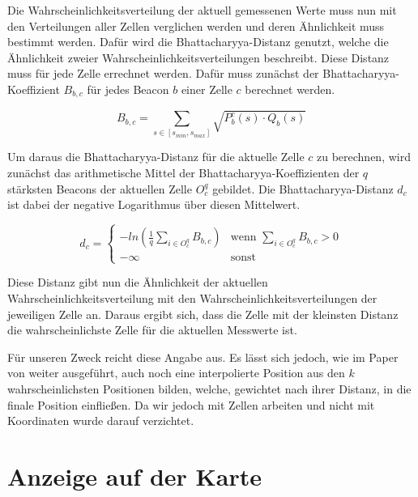 Die Wahrscheinlichkeitsverteilung der aktuell gemessenen Werte muss nun mit den Verteilungen aller Zellen verglichen werden und deren Ähnlichkeit muss bestimmt werden. Dafür wird die Bhattacharyya-Distanz genutzt, welche die Ähnlichkeit zweier Wahrscheinlichkeitsverteilungen beschreibt. 
Diese Distanz muss für jede Zelle errechnet werden. 
Dafür muss zunächst der Bhattacharyya-Koeffizient $B_{b, c}$ für jedes Beacon $b$ einer Zelle $c$ berechnet werden.

\begin{equation}
	B_{b, c} = \sum_{s \in [s_{min},s_{max}]} \sqrt{P_{b}^{c}(s) \cdot Q_{b}(s)}
\end{equation}

Um daraus die Bhattacharyya-Distanz für die aktuelle Zelle $c$ zu berechnen, wird zunächst das arithmetische Mittel der Bhattacharyya-Koeffizienten der $q$ stärksten Beacons der aktuellen Zelle $O_{c}^{q}$ gebildet. Die Bhattacharyya-Distanz $d_{c}$ ist dabei der negative Logarithmus über diesen Mittelwert.

\begin{equation}
	d_{c}= \begin{cases}
	-ln (\frac{1}{q} \sum_{i \in O_{c}^{q}} B_{b, c}) & \text{wenn } \sum_{i \in O_{c}^{q}} B_{b, c} > 0 \\
	- \infty & \text{sonst}
	\end{cases}
\end{equation}

Diese Distanz gibt nun die Ähnlichkeit der aktuellen Wahrscheinlichkeitsverteilung mit den Wahrscheinlichkeitsverteilungen der jeweiligen Zelle an. Daraus ergibt sich, dass die Zelle mit der kleinsten Distanz die wahrscheinlichste Zelle für die aktuellen Messwerte ist.

Für unseren Zweck reicht diese Angabe aus. Es lässt sich jedoch, wie im Paper von \citet{wifiFingerprintProbability} weiter ausgeführt, auch noch eine interpolierte Position aus den $k$ wahrscheinlichsten Positionen bilden, welche, gewichtet nach ihrer Distanz, in die finale Position einfließen. Da wir jedoch mit Zellen arbeiten und nicht mit Koordinaten wurde darauf verzichtet. 


\section{Anzeige auf der Karte}
\label{sec:map}

